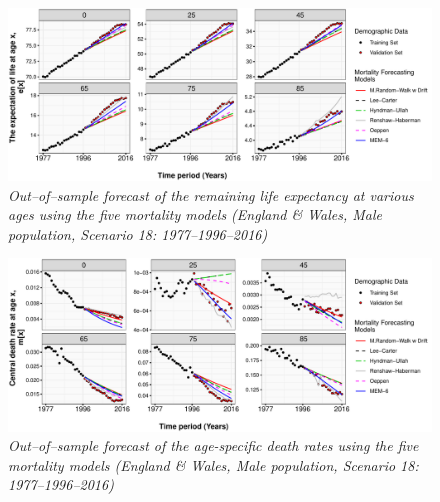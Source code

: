 \documentclass[T0_MEM]{subfiles}
\begin{document}
\begin{figure}[!h]
  \centering
  \includegraphics[width=1\linewidth]{figure/Figure_GBRTENW_ex}
  \caption{\textit{Out--of--sample forecast of the remaining life expectancy at various ages using the five mortality models (England \& Wales, Male population, Scenario 18: 1977--1996--2016)}}
  \label{fig:Forecast_ex}
\end{figure}

\begin{figure}[!h]
  \centering
  \includegraphics[width=1\linewidth]{figure/Figure_GBRTENW_mx}
  \caption{\textit{Out--of--sample forecast of the age-specific death rates using the five mortality models (England \& Wales, Male population, Scenario 18: 1977--1996--2016)}}
  \label{fig:Forecast_mx}
\end{figure}
\end{document}
